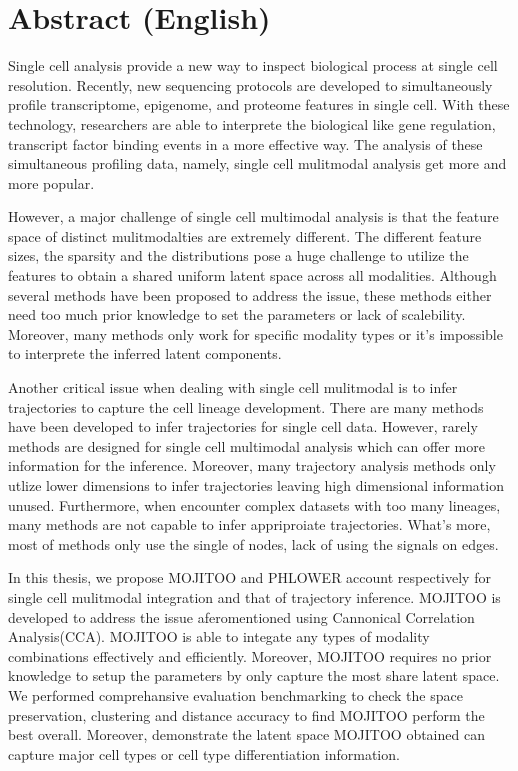 \chapter*{Abstract (English)}

Single cell analysis provide a new way to inspect biological process at single cell resolution. Recently, new sequencing protocols are developed to simultaneously profile transcriptome, epigenome, and proteome features in single cell. With these technology, researchers are able to interprete the biological like gene regulation, transcript factor binding events in a more effective way. The analysis of these simultaneous profiling data, namely, single cell mulitmodal analysis get more and more popular.

However, a major challenge of single cell multimodal analysis is that the feature space of distinct mulitmodalties are extremely different. The different feature sizes, the sparsity and the distributions pose a huge challenge to utilize the features to obtain a shared uniform latent space across all modalities. Although several methods have been proposed to address the issue, these methods either need too much prior knowledge to set the parameters or lack of scalebility. Moreover, many methods only work for specific modality types or it's impossible to interprete the inferred latent components.


Another critical issue when dealing with single cell mulitmodal is to infer trajectories to capture the cell lineage development. There are many methods have been developed to infer trajectories for single cell data. However, rarely methods are designed for single cell multimodal analysis which can offer more information for the inference. Moreover, many trajectory analysis methods only utlize lower dimensions to infer trajectories leaving high dimensional information unused. Furthermore, when encounter complex datasets with too many lineages, many methods are not capable to infer appriproiate trajectories. What's more, most of methods only use the single of nodes, lack of using the signals on edges.


In this thesis, we propose MOJITOO and PHLOWER account respectively for single cell mulitmodal integration and that of trajectory inference. MOJITOO is developed to address the issue aferomentioned using Cannonical Correlation Analysis(CCA). MOJITOO is able to integate any types of modality combinations effectively and efficiently. Moreover, MOJITOO requires no prior knowledge to setup the parameters by only capture the most share latent space. We performed comprehansive evaluation benchmarking to check the space preservation, clustering and distance accuracy to find MOJITOO perform the best overall. Moreover, demonstrate the latent space MOJITOO obtained can capture major cell types or cell type differentiation information.

